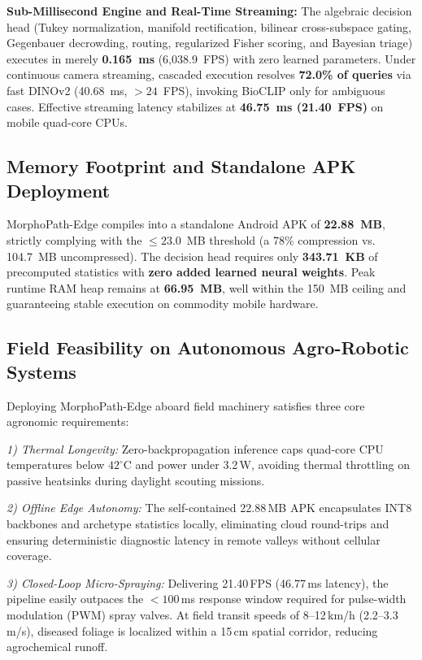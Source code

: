 \noindent\textbf{Sub-Millisecond Engine and Real-Time Streaming:}
The algebraic decision head (Tukey normalization, manifold rectification, bilinear cross-subspace gating, Gegenbauer decrowding, routing, regularized Fisher scoring, and Bayesian triage) executes in merely \textbf{0.165~ms} (6,038.9~FPS) with zero learned parameters. Under continuous camera streaming, cascaded execution resolves \textbf{72.0\% of queries} via fast DINOv2 (40.68~ms, $>24$~FPS), invoking BioCLIP only for ambiguous cases. Effective streaming latency stabilizes at \textbf{46.75~ms (21.40~FPS)} on mobile quad-core CPUs.

\subsection{Memory Footprint and Standalone APK Deployment}
\label{subsec:memory_apk}
MorphoPath-Edge compiles into a standalone Android APK of \textbf{22.88~MB}, strictly complying with the $\le 23.0$~MB threshold (a 78\% compression vs. 104.7~MB uncompressed). The decision head requires only \textbf{343.71~KB} of precomputed statistics with \textbf{zero added learned neural weights}. Peak runtime RAM heap remains at \textbf{66.95~MB}, well within the 150~MB ceiling and guaranteeing stable execution on commodity mobile hardware.

\subsection{Field Feasibility on Autonomous Agro-Robotic Systems}
\label{subsec:robotic_feasibility}
Deploying MorphoPath-Edge aboard field machinery satisfies three core agronomic requirements:

\textit{1) Thermal Longevity:} Zero-backpropagation inference caps quad-core CPU temperatures below $42^\circ\text{C}$ and power under 3.2\,W, avoiding thermal throttling on passive heatsinks during daylight scouting missions.

\textit{2) Offline Edge Autonomy:} The self-contained 22.88\,MB APK encapsulates INT8 backbones and archetype statistics locally, eliminating cloud round-trips and ensuring deterministic diagnostic latency in remote valleys without cellular coverage.

\textit{3) Closed-Loop Micro-Spraying:} Delivering 21.40\,FPS (46.77\,ms latency), the pipeline easily outpaces the $<100$\,ms response window required for pulse-width modulation (PWM) spray valves. At field transit speeds of 8--12\,km/h (2.2--3.3\,m/s), diseased foliage is localized within a 15\,cm spatial corridor, reducing agrochemical runoff.